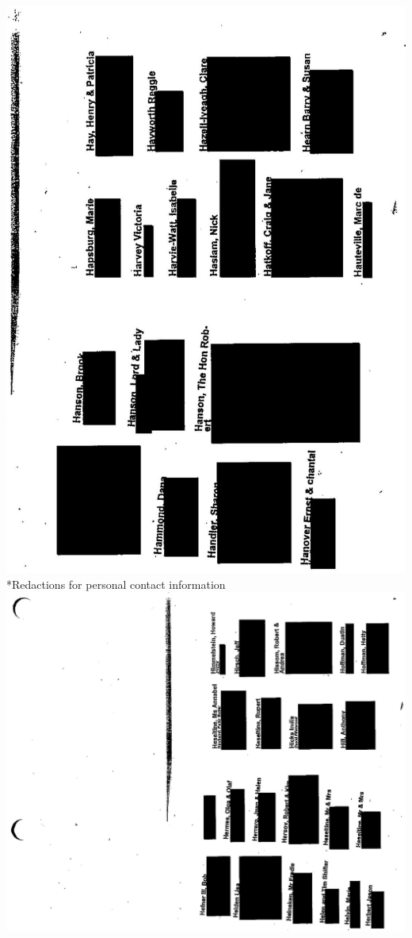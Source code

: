 \documentclass[10pt]{article}
\begin{document}
\includegraphics[max width=\textwidth, center]{2025_02_27_dd68c3d38de88f0516d9g-147}\\
*Redactions for personal contact information\\
\includegraphics[max width=\textwidth, center]{2025_02_27_dd68c3d38de88f0516d9g-148}\\
\end{document}
